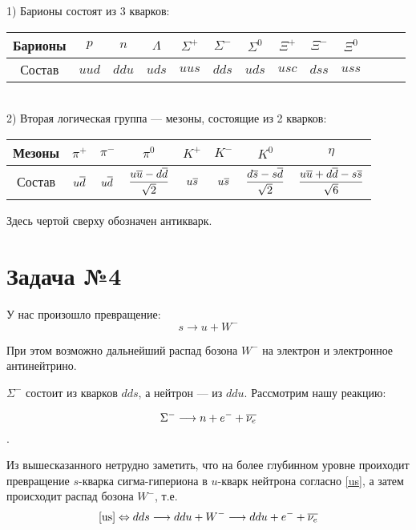 \documentclass[12pt]{urticle}
\newcommand{\ov}{\ensuremath{\overline}}
\newcommand{\st}{\ensuremath{\longrightarrow}}
\begin{document}
1) Барионы состоят из 3 кварков: 

\begin{tabular}{|c|c|c|c|c|c|c|c|c|c|c|c|c|}
	\hline 
	Барионы&$  p $ & $ n $ &$  \Lambda $ & $ \Sigma^+ $ &$  \Sigma^- $ & $ \Sigma^0 $ & $ \Xi^+ $ & $ \Xi^- $ & $ \Xi^0 $    \\ 
	\hline 
	Состав & $ uud $ & $ ddu $ & $ uds $ & $ uus $ & $ dds $ & $ uds $ & $ usc $ & $ dss $ & $ uss $   \\ 
	\hline 
\end{tabular} 
\\

2) Вторая логическая группа --- мезоны, состоящие из 2 кварков: 
\par
\vspace{0.1cm}
\begin{tabular}{|c|c|c|c|c|c|c|c|}
	\hline 
	Мезоны &$  \pi^+ $ & $ \pi^-  $& $ \pi^0 $ &$  K^+ $ & $ K^-  $& $ K^0 $ & $ \eta $ \\ 
	\hline 
	Состав &$  u\ov{d} $ & $ u\ov{d} $ & $ \dfrac{u\ov{u} - d\ov{d}}{\sqrt{2}} $ & $ u\ov{s} $ & $ u\ov{s}  $& $ \dfrac{d\ov{s} - s\ov{d}}{\sqrt{2}}  $ &  $ \dfrac{u\ov{u} + d\ov{d} - s\ov{s}}{\sqrt{6}} $  \\ 
	\hline 
\end{tabular} 

Здесь чертой сверху обозначен антикварк.

\section{Задача №4}

У нас произошло превращение: 
\begin{equation}
s \st u + W^-
\label{us}
\end{equation}

При этом возможно дальнейший распад бозона $ W^- $ на электрон и электронное антинейтрино. 

$ \Sigma^- $ состоит из кварков $  dds $, а нейтрон --- из $ ddu $.  Рассмотрим нашу реакцию: 

$$ \Sigma^- \st n + e^- + \ov{\nu_e} $$. 

Из вышесказанного нетрудно заметить, что на более глубинном уровне проиходит превращение $ s$-кварка сигма-гипериона в $ u $-кварк нейтрона согласно \eqref{us}, а затем происходит распад бозона $ W^- $, т.е. 
\begin{equation}
\eqref{us} \Leftrightarrow dds \st ddu + W^- \st ddu + e^- + \ov{\nu_e}
\end{equation}
\end{document}
